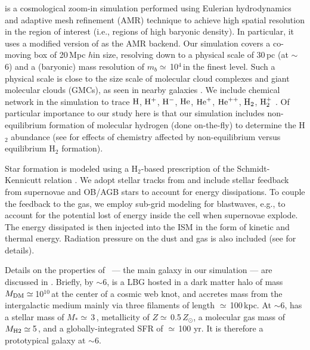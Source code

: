 \documentclass[iop]{emulateapj} %
\begin{document}
 is a cosmological zoom-in simulation performed using Eulerian hydrodynamics and
adaptive mesh refinement (AMR) technique to achieve high spatial resolution in the region of interest (i.e., regions of high baryonic density).
In particular, it uses a modified version of  \citep{Teyssier2002a} as the AMR backend.
Our simulation covers a co-moving box of 20\,Mpc $h$\pmOne in size, resolving down to a physical scale of 30\,pc (at \z$\sim$\,6) and a (baryonic) mass resolution of $m_b\simeq$\,10$^4$\,\Msun in the finest level. Such a physical scale is close to the size scale of molecular cloud complexes and giant molecular clouds (GMCs), as seen in nearby galaxies \citep[e.g.,][]{Sanders85a, Federrath13a, Goodman14a}.
We include chemical network in the simulation to trace $\rm{H}$, $\rm{H}^{+}$, $\rm{H}^{-}$, $\rm{He}$, $\rm{He}^{+}$, $\rm{He}^{++}$, $\rm{H}_2$, $\rm{H}_2^{+}$ \citep{Grassi14a,Bovino16a}.
Of particular importance to our study here is that our simulation includes non-equilibrium formation of molecular hydrogen (done on-the-fly) to determine the H$_2$ abundance (see \citealt{Pallottini17b} for effects of chemistry affected by non-equilibrium versus equilibrium H$_2$ formation).

Star formation is modeled using a H$_2$-based prescription of the Schmidt-Kennicutt relation \citep{Krumholz09a}. We adopt stellar tracks from  and include stellar feedback from supernovae and OB/AGB stars to account for energy dissipations. To couple the feedback to the gas, we employ sub-grid modeling for blastwaves, e.g., to account for the potential lost of energy inside the cell when supernovae explode. The energy dissipated is then injected into the ISM in the form of kinetic and thermal energy. Radiation pressure on the dust and gas is also included (see \citealt{Pallottini17a} for details).

Details on the properties of \flower\ --- the main galaxy in our simulation --- are discussed in \citet{Pallottini17b}.
Briefly, by \z$\sim$6, \flower is a LBG hosted in a dark matter halo of mass $M_{\rm DM}\simeq$\,10$^{10}$\,\Msun at the center of a cosmic web knot, and accretes mass from the intergalactic medium mainly via three filaments of length $\simeq$\,100\,kpc. At \z$\sim$6, \flower has a stellar mass of $M_*\simeq$\,3\,\Msun, metallicity of $Z\simeq$\,0.5\,$Z_{\odot}$, a molecular gas mass of $M_{\rm H2}\simeq$\,5\,\Msun, and a globally-integrated SFR of $\simeq$\,100\,\Msun\,yr\pmOne. It is therefore a prototypical galaxy at \z$\sim$6.
\end{document}
